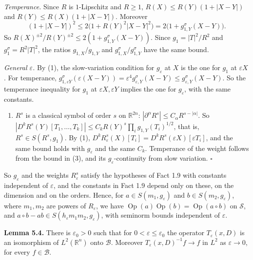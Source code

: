 \documentclass[
  11pt,
]{article}
\providecommand{\tightlist}{%
  \setlength{\itemsep}{0pt}\setlength{\parskip}{0pt}}
\begin{document}
\emph{Temperance.} Since \(R\) is \(1\)-Lipschitz and \(R\ge1\),
\(R(X)\le R(Y)(1+|X-Y|)\) and \(R(Y)\le R(X)(1+|X-Y|)\). Moreover \[
(1+|X-Y|)^2\le2\bigl(1+R(Y)^2|X-Y|^2\bigr)=2\bigl(1+g^\sigma_{1,Y}(X-Y)\bigr).
\] So \(R(X)^{\pm2}/R(Y)^{\pm2}\le2(1+g^\sigma_{1,Y}(X-Y))\). Since
\(g_1=|T|^2/R^2\) and \(g_1^\sigma=R^2|T|^2\), the ratios
\(g_{1,X}/g_{1,Y}\) and \(g^\sigma_{1,X}/g^\sigma_{1,Y}\) have the same
bound.

\emph{General \(\varepsilon\).} By (1), the slow-variation condition for
\(g_\varepsilon\) at \(X\) is the one for \(g_1\) at \(\varepsilon X\).
For temperance,
\(g^\sigma_{1,\varepsilon Y}(\varepsilon(X-Y))=\varepsilon^4g^\sigma_{\varepsilon,Y}(X-Y)\le g^\sigma_{\varepsilon,Y}(X-Y)\).
So the temperance inequality for \(g_1\) at
\(\varepsilon X,\varepsilon Y\) implies the one for \(g_\varepsilon\),
with the same constants.

\begin{enumerate}
\def\labelenumi{(\arabic{enumi})}
\setcounter{enumi}{3}
\tightlist
\item
  \(R^s\) is a classical symbol of order \(s\) on \(\mathbb R^{2n}\):
  \(|\partial^\alpha R^s|\le C_\alpha R^{s-|\alpha|}\). So
  \(|D^kR^s(Y)[T_1,\dots,T_k]|\le C_kR(Y)^s\prod_ig_{1,Y}(T_i)^{1/2}\),
  that is, \(R^s\in S(R^s,g_1)\). By (1),
  \(D^kR_\varepsilon^s(X)[T_i]=D^kR^s(\varepsilon X)[\varepsilon T_i]\),
  and the same bound holds with \(g_\varepsilon\) and the same \(C_k\).
  Temperance of the weight follows from the bound in (3), and its
  \(g_\varepsilon\)-continuity from slow variation. \(\square\)
\end{enumerate}

So \(g_\varepsilon\) and the weights \(R_\varepsilon^s\) satisfy the
hypotheses of Fact 1.9 with constants independent of \(\varepsilon\),
and the constants in Fact 1.9 depend only on these, on the dimension and
on the orders. Hence, for \(a\in S(m_1,g_\varepsilon)\) and
\(b\in S(m_2,g_\varepsilon)\), where \(m_1,m_2\) are powers of
\(R_\varepsilon\), we have
\(\operatorname{Op}(a)\operatorname{Op}(b)=\operatorname{Op}(a\circ b)\)
on \(\mathcal S\), and
\(a\circ b-ab\in S(h_\varepsilon m_1m_2,g_\varepsilon)\), with seminorm
bounds independent of \(\varepsilon\).

\textbf{Lemma 5.4.} There is \(\varepsilon_0>0\) such that for
\(0<\varepsilon\le\varepsilon_0\) the operator \(T_\varepsilon(x,D)\) is
an isomorphism of \(L^2(\mathbb R^n)\) onto \(\mathcal B\). Moreover
\(T_\varepsilon(x,D)^{-1}f\to f\) in \(L^2\) as \(\varepsilon\to0\), for
every \(f\in\mathcal B\).
\end{document}
